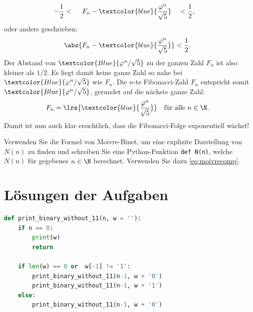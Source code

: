 \begin{myremark}
\begin{alignat*}{2}
		- \frac{1}{2}                                              & < \quad\; F_n - \textcolor{blue}{\frac{\varphi^n}{\sqrt{5}}}                                                          &  & < \frac{1}{2},
	\end{alignat*}
	oder anders geschrieben:
	\begin{align*}
		\abs{F_n-\textcolor{blue}{\frac{\varphi^n}{\sqrt{5}}}} < \frac{1}{2}.
	\end{align*}
	Der Abstand von $\textcolor{Blue}{\varphi^n/\sqrt{5}}$ zu der ganzen Zahl $F_n$ ist also kleiner als $1/2$. Es liegt damit keine ganze Zahl so nahe bei $\textcolor{Blue}{\varphi^n/\sqrt{5}}$ wie $F_n$. Die $n$-te Fibonacci-Zahl $F_n$ entspricht somit $\textcolor{Blue}{\varphi^n/\sqrt{5}}$, gerundet auf die nächste ganze Zahl:
	\begin{align}\label{eq:moivrecomp}
		F_n = \lrs{\textcolor{blue}{\frac{\varphi^n}{\sqrt{5}}}} \quad\text{für alle } n\in\N.
	\end{align}
	Damit ist nun auch klar ersichtlich, dass die Fibonacci-Folge exponentiell wächst!
\end{myremark}

\begin{myexercise}\label{myexercise:0406}
	Verwenden Sie die Formel von Moivre-Binet, um eine explizite Darstellung von $N(n)$ zu finden und schreiben Sie eine Python-Funktion \lstinline|def N(n)|, welche $N(n)$ für gegebenes $n\in\N$ berechnet. Verwenden Sie dazu \cref{eq:moivrecomp}.
\end{myexercise}

\clearpage
\section{Lösungen der Aufgaben}

\begin{myanswer}[myexercise:0401]
	\begin{lstlisting}[language=Python,caption=binäre Strings ohne $11$]
def print_binary_without_11(n, w = ''):
    if n == 0:
        print(w)
        return
    
    if len(w) == 0 or  w[-1] != '1':
        print_binary_without_11(n-1, w + '0')
        print_binary_without_11(n-1, w + '1')
    else:
        print_binary_without_11(n-1, w + '0')
\end{lstlisting}
\end{myanswer}

